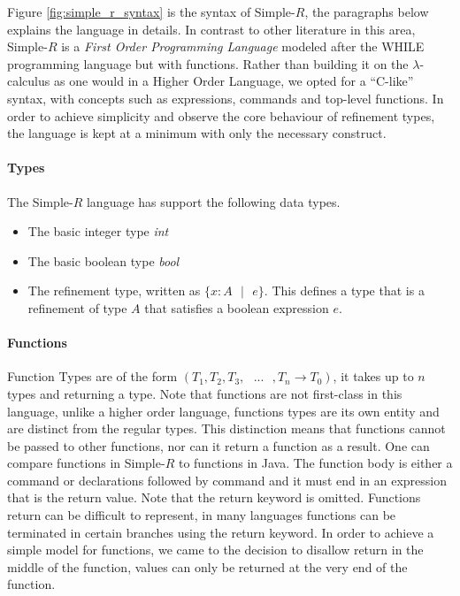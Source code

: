 \documentclass[a4paper,12pt]{report}
\begin{document}
\par
Figure \ref{fig:simple_r_syntax} is the syntax of Simple-$R$, the paragraphs below 
explains the language in details. In contrast to other literature in this area, 
Simple-$R$ is a \textit{First Order Programming Language} \cite{FOL} modeled 
after the WHILE \cite{whileLanguage} programming language but with functions.
Rather than building it on the $\lambda$-calculus as one would in 
a Higher Order Language, we opted for a ``C-like'' syntax, with concepts such as 
expressions, commands and top-level functions. 
In order to achieve simplicity and observe the core behaviour of refinement 
types, the language is kept at a minimum with only the necessary construct. 

\paragraph{Types} The Simple-$R$ language has support the following data types. 
\begin{itemize}
  \item The basic integer type \textit{int}
  \item The basic boolean type \textit{bool}
  \item The refinement type, written as $\{x: A\text{ }|\text{ }e\}$. This defines 
  a type that is a refinement of type $A$ that satisfies a boolean expression $e$.
\end{itemize}

\paragraph{Functions}
Function Types are of the form $(T_1, T_2,T_3,\text{ }...\text{ },T_n \longrightarrow T_0)$, 
it takes up to $n$ types and returning a type. Note that functions are 
not first-class in this language, unlike a higher order 
language, functions types are its own entity and are distinct from the regular 
types. This distinction means that functions cannot be passed to 
other functions, nor can it return a function as a result. One can compare 
functions in Simple-$R$ to functions in Java. The function body is either a 
command or declarations followed by command and it must end in an 
expression that is the return value. Note that the 
return keyword is omitted. Functions return can be difficult to represent, in many 
languages functions can be terminated in certain branches using the 
return keyword. In order to achieve a simple model for functions, we came to 
the decision to disallow return in the middle of the function, values can 
only be returned at the very end of the function.
\end{document}
